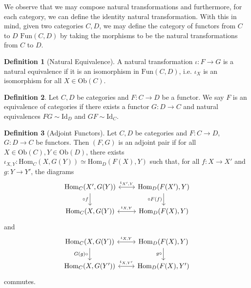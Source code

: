 \documentclass[]{article}
\theoremstyle{definition}
\theoremstyle{definition}
\newtheorem{definition}{Definition}[section]
\begin{document}
We observe that we may compose natural transformations and furthermore, for 
each category, we can define the identity natural transformation. With this 
in mind, given two categories \(C, D\), we may define the category of 
functors from \(C\) to \(D\) \(\text{Fun}(C, D)\) by taking the morphisms 
to be the natural transformations from \(C\) to \(D\). 

\begin{definition}[Natural Equivalence]
  A natural transformation \(\iota : F \to G\) is a natural equivalence if it 
  is an isomorphism in \(\text{Fun}(C, D)\), i.e. \(\iota_X\) is an isomorphism 
  for all \(X \in \text{Ob}(C)\).
\end{definition}

\begin{definition}
  Let \(C, D\) be categories and \(F : C \to D\) be a functor. We say \(F\) is an 
  equivalence of categories if there exists a functor \(G : D \to C\) and 
  natural equivalences \(FG \sim \text{Id}_D\) and \(GF \sim \text{Id}_C\).
\end{definition}

\begin{definition}[Adjoint Functors]
  Let \(C, D\) be categories and \(F : C \to D\), \(G : D \to C\) be functors.
  Then \((F, G)\) is an adjoint pair if for all \(X \in \text{Ob}(C), Y \in \text{Ob}(D)\), 
  there exists \(\iota_{X, Y} : \text{Hom}_C(X, G(Y)) \simeq \text{Hom}_D(F(X), Y)\) 
  such that, for all \(f : X \to X'\) and \(g : Y \to Y'\), the diagrams  
  \[\begin{tikzcd}
    \text{Hom}_C(X', G(Y)) \arrow[<->, r, "\iota_{X', Y}"] 
      \arrow[swap, d, "\circ f"] & \text{Hom}_D(F(X'), Y) \arrow[swap, d, "\circ F(f)"] \\
      \text{Hom}_C(X, G(Y)) \arrow[<->, r, "\iota_{X, Y}"] & \text{Hom}_D(F(X), Y)
  \end{tikzcd}\] 
  and
  \[\begin{tikzcd}
    \text{Hom}_C(X, G(Y)) \arrow[<->, r, "\iota_{X, Y}"] 
      \arrow[swap, d, "G(g) \circ"] & \text{Hom}_D(F(X), Y) \arrow[swap, d, "g \circ"] \\
      \text{Hom}_C(X, G(Y')) \arrow[<->, r, "\iota_{X, Y'}"] & \text{Hom}_D(F(X), Y')
  \end{tikzcd}\] 
  commutes.
\end{definition}
\end{document}
